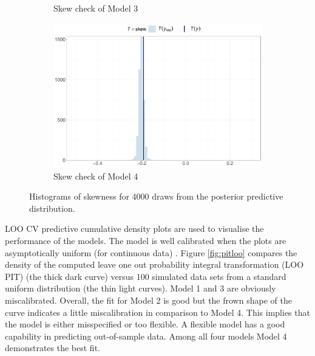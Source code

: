 \documentclass[a4paper]{article}   	%
\begin{document}
\begin{figure}[!htp]
\begin{subfigure}[t]{0.45\textwidth}
			\caption{Skew check of Model 3}
		\end{subfigure}
		\begin{subfigure}[t]{0.45\textwidth}
			\includegraphics[width=\linewidth]{Images/skew_STRand_scale.pdf}
			\caption{Skew check of Model 4}
		\end{subfigure}
		\caption{Histograms of skewness for 4000 draws from the posterior predictive distribution.}\label{fig:skewcheck}
	\end{figure}
	
	
	LOO CV predictive cumulative density plots are used to visualise the performance of the models. The model is well calibrated when the plots are asymptotically uniform (for continuous data) \parencite{gabry2019Visualization, Gelman2013Bayesian}. Figure \ref{fig:pitloo} compares the density of the computed leave one out probability integral transformation (LOO PIT) (the thick dark curve) versus 100 simulated data sets from a standard uniform distribution (the thin light curves). Model 1 and 3 are obviously miscalibrated. Overall, the fit for Model 2 is good but the frown shape of the curve indicates a little miscalibration in comparison to Model 4. This implies that the model is either misspecified or too flexible. A flexible model has a good capability in predicting out-of-sample data. Among all four models Model 4 demonstrates the best fit.
	
\end{document}
